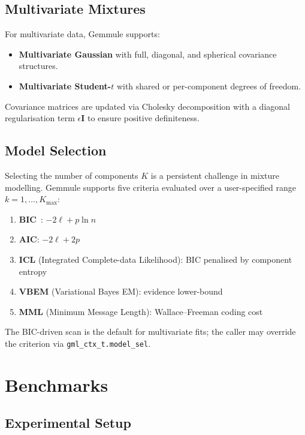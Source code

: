 ﻿\documentclass[10pt,twocolumn]{article}
\begin{document}
\subsection{Multivariate Mixtures}

For multivariate data, Gemmule supports:
\begin{itemize}[leftmargin=*,noitemsep]
  \item \textbf{Multivariate Gaussian} with full, diagonal, and spherical
        covariance structures.
  \item \textbf{Multivariate Student-$t$} with shared or per-component
        degrees of freedom.
\end{itemize}

Covariance matrices are updated via Cholesky decomposition with a diagonal
regularisation term $\epsilon \mathbf{I}$ to ensure positive definiteness.

\subsection{Model Selection}

Selecting the number of components $K$ is a persistent challenge in mixture
modelling.
Gemmule supports five criteria evaluated over a user-specified
range $k = 1, \ldots, K_{\max}$:

\begin{enumerate}[leftmargin=*,noitemsep]
  \item \textbf{BIC}~\citep{schwarz1978estimating}: $-2\ell + p\ln n$
  \item \textbf{AIC}: $-2\ell + 2p$
  \item \textbf{ICL} (Integrated Complete-data Likelihood):
        BIC penalised by component entropy
  \item \textbf{VBEM} (Variational Bayes EM): evidence lower-bound
  \item \textbf{MML} (Minimum Message Length): Wallace--Freeman coding cost
\end{enumerate}

The BIC-driven scan is the default for multivariate fits; the caller may
override the criterion via \texttt{gml\_ctx\_t.model\_sel}.

\section{Benchmarks}

\subsection{Experimental Setup}
\end{document}
